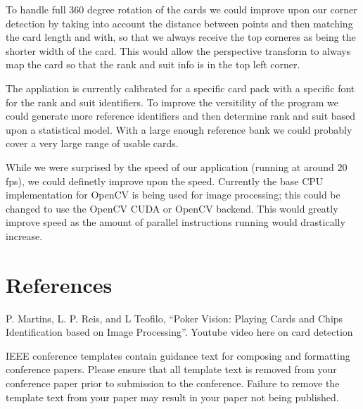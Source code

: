 \documentclass[conference]{IEEEtran}
\begin{document}
To handle full 360 degree rotation of the cards we could improve upon our corner detection by taking
into account the distance between points and then matching the card length and with, so that we
always receive the top corneres as being the shorter width of the card. This would allow the
perspective transform to always map the card so that the rank and suit info is in the top left
corner.

The appliation is currently calibrated for a specific card pack with a specific font for the rank
and suit identifiers. To improve the versitility of the program we could generate more reference
identifiers and then determine rank and suit based upon a statistical model. With a large enough
reference bank we could probably cover a very large range of usable cards.

While we were surprised by the speed of our application (running at around 20 fps), we could
definetly improve upon the speed. Currently the base CPU implementation for OpenCV is being used for
image processing; this could be changed to use the OpenCV CUDA or OpenCV backend. This would greatly
improve speed as the amount of parallel instructions running would drastically increase.


\section*{References}
\begin{thebibliography}{00}
 P. Martins, L. P. Reis, and L Teofilo, ``Poker Vision: Playing Cards and
    Chips Identification based on Image Processing''.
 Youtube video here on card detection
\end{thebibliography}
\vspace{12pt}
\color{red}
IEEE conference templates contain guidance text for composing and formatting conference papers. Please ensure that all template text is removed from your conference paper prior to submission to the conference. Failure to remove the template text from your paper may result in your paper not being published.
\end{document}
